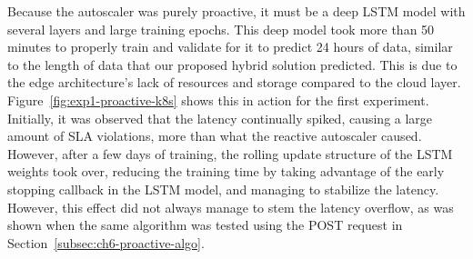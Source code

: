 \begin{center}
\begin{minipage}{\linewidth}
    \label{fig:exp1-proactive-k8s}
\end{minipage}
\end{center}

Because the autoscaler was purely proactive, it must be a deep LSTM model with several layers and large training epochs. This deep model took more than 50 minutes to properly train and validate for it to predict 24 hours of data, similar to the length of data that our proposed hybrid solution predicted. This is due to the edge architecture's lack of resources and storage compared to the cloud layer. Figure~\ref{fig:exp1-proactive-k8s} shows this in action for the first experiment. Initially, it was observed that the latency continually spiked, causing a large amount of SLA violations, more than what the reactive autoscaler caused. However, after a few days of training, the rolling update structure of the LSTM weights took over, reducing the training time by taking advantage of the early stopping callback in the LSTM model, and managing to stabilize the latency. However, this effect did not always manage to stem the latency overflow, as was shown when the same algorithm was tested using the POST request in Section~\ref{subsec:ch6-proactive-algo}.

